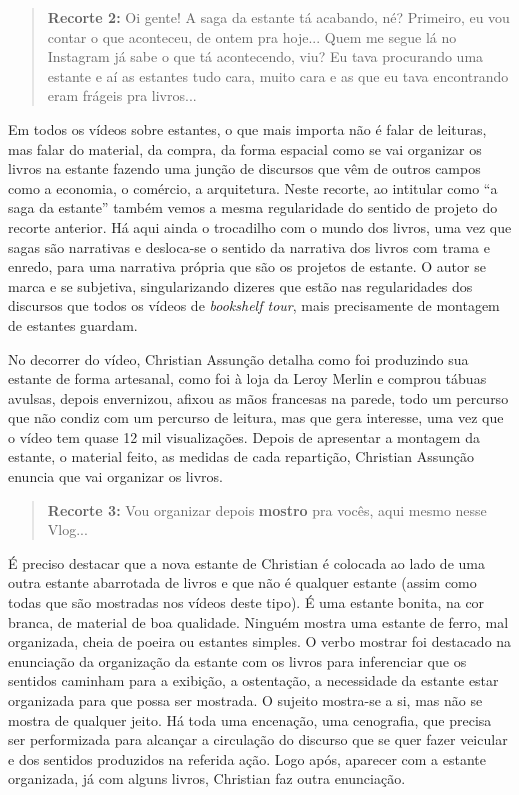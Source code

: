\begin{quote}
\textbf{Recorte 2:}
Oi gente! A saga da estante tá acabando, né? Primeiro, eu vou contar o
que aconteceu, de ontem pra hoje... Quem me segue lá no Instagram
já sabe o que tá acontecendo, viu? Eu tava procurando uma estante e aí
as estantes tudo cara, muito cara e as que eu tava encontrando eram
frágeis pra livros...
\end{quote}

Em todos os vídeos sobre estantes, o que mais importa não é falar de
leituras, mas falar do material, da compra, da forma espacial como se
vai organizar os livros na estante fazendo uma junção de discursos que
vêm de outros campos como a economia, o comércio, a arquitetura. Neste
recorte, ao intitular como \enquote{a saga da estante} também vemos a mesma
regularidade do sentido de projeto do recorte anterior. Há aqui ainda o
trocadilho com o mundo dos livros, uma vez que sagas são narrativas e
desloca-se o sentido da narrativa dos livros com trama e enredo, para
uma narrativa própria que são os projetos de estante. O autor se marca e
se subjetiva, singularizando dizeres que estão nas regularidades dos
discursos que todos os vídeos de \textit{bookshelf tour}, mais precisamente
de montagem de estantes guardam.

No decorrer do vídeo, Christian Assunção detalha como foi produzindo sua
estante de forma artesanal, como foi à loja da Leroy Merlin e comprou
tábuas avulsas, depois envernizou, afixou as mãos francesas na parede,
todo um percurso que não condiz com um percurso de leitura, mas que gera
interesse, uma vez que o vídeo tem quase 12 mil visualizações. Depois de
apresentar a montagem da estante, o material feito, as medidas de cada
repartição, Christian Assunção enuncia que vai organizar os livros.

\begin{quote}
\textbf{Recorte 3:}
Vou organizar depois \textbf{mostro} pra vocês, aqui mesmo nesse
Vlog...  
\end{quote}


É preciso destacar que a nova estante de Christian é colocada ao lado de
uma outra estante abarrotada de livros e que não é qualquer estante
(assim como todas que são mostradas nos vídeos deste tipo). É uma
estante bonita, na cor branca, de material de boa qualidade. Ninguém
mostra uma estante de ferro, mal organizada, cheia de poeira ou estantes
simples. O verbo mostrar foi destacado na enunciação da organização da
estante com os livros para inferenciar que os sentidos caminham para a
exibição, a ostentação, a necessidade da estante estar organizada para
que possa ser mostrada. O sujeito mostra-se a si, mas não se mostra de
qualquer jeito. Há toda uma encenação, uma cenografia, que precisa ser
performizada para alcançar a circulação do discurso que se quer fazer
veicular e dos sentidos produzidos na referida ação. Logo após, aparecer
com a estante organizada, já com alguns livros, Christian faz outra
enunciação.

